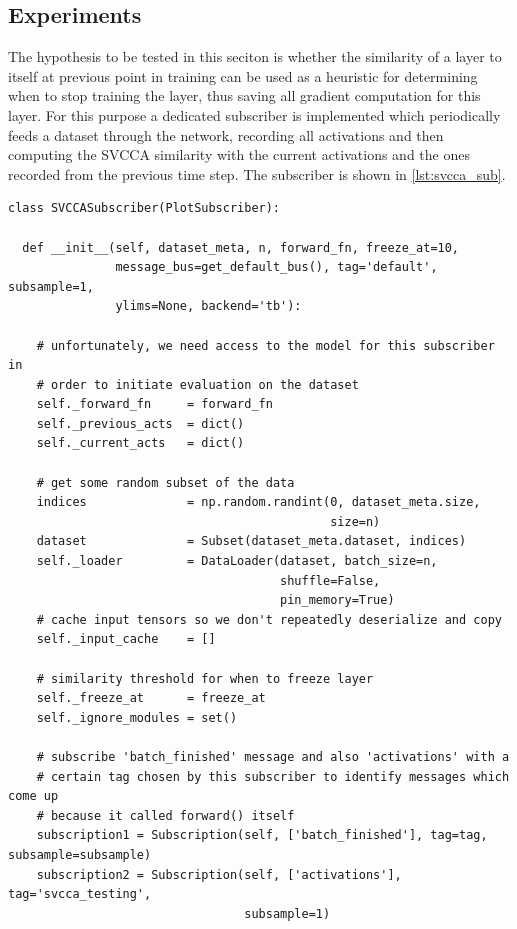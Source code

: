 \subsection{Experiments}%
\label{sub:saturation-experiments}

The hypothesis to be tested in this seciton is whether the similarity of a layer
to itself at previous point in training can be used as a heuristic for
determining when to stop training the layer, thus saving all gradient
computation for this layer. For this purpose a dedicated subscriber is
implemented which periodically feeds a dataset through the network, recording
all activations and then computing the SVCCA similarity with the current
activations and the ones recorded from the previous time step. The subscriber is
shown in \cref{lst:svcca_sub}.

\begin{lstlisting}[label={lst:svcca_sub},
caption={SVCCA Subscriber}]
class SVCCASubscriber(PlotSubscriber):

  def __init__(self, dataset_meta, n, forward_fn, freeze_at=10,
               message_bus=get_default_bus(), tag='default', subsample=1,
               ylims=None, backend='tb'):

    # unfortunately, we need access to the model for this subscriber in
    # order to initiate evaluation on the dataset
    self._forward_fn     = forward_fn
    self._previous_acts  = dict()
    self._current_acts   = dict()

    # get some random subset of the data
    indices              = np.random.randint(0, dataset_meta.size,
                                             size=n)
    dataset              = Subset(dataset_meta.dataset, indices)
    self._loader         = DataLoader(dataset, batch_size=n,
                                      shuffle=False,
                                      pin_memory=True)
    # cache input tensors so we don't repeatedly deserialize and copy
    self._input_cache    = []

    # similarity threshold for when to freeze layer
    self._freeze_at      = freeze_at
    self._ignore_modules = set()

    # subscribe 'batch_finished' message and also 'activations' with a
    # certain tag chosen by this subscriber to identify messages which come up
    # because it called forward() itself
    subscription1 = Subscription(self, ['batch_finished'], tag=tag, subsample=subsample)
    subscription2 = Subscription(self, ['activations'], tag='svcca_testing',
                                 subsample=1)


\end{lstlisting}

